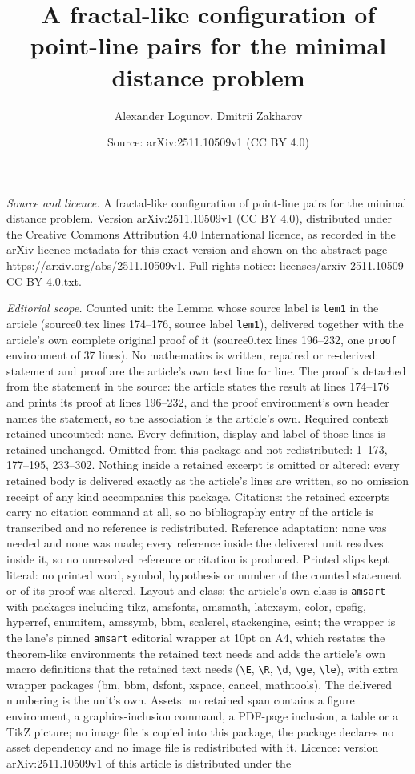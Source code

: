 \documentclass[10pt,a4paper]{amsart}
\title[A fractal-like configuration of point-line pairs for the min]{A fractal-like configuration of point-line pairs for the minimal distance problem}
\author{Alexander Logunov, Dmitrii Zakharov}
\date{Source: arXiv:2511.10509v1 (CC BY 4.0)}
\begin{document}
\maketitle

\noindent\emph{Source and licence.} A fractal-like configuration of point-line pairs for the minimal distance problem. Version arXiv:2511.10509v1 (CC BY 4.0), distributed under the Creative Commons Attribution 4.0 International licence, as recorded in the arXiv licence metadata for this exact version and shown on the abstract page https://arxiv.org/abs/2511.10509v1. Full rights notice: licenses/arxiv-2511.10509-CC-BY-4.0.txt.\par\smallskip

\noindent\textit{Editorial scope.} Counted unit: the Lemma whose source label is \texttt{lem1} in the article (source0.tex lines 174--176, source label \texttt{lem1}), delivered together with the article's own complete original proof of it (source0.tex lines 196--232, one \texttt{proof} environment of 37 lines). No mathematics is written, repaired or re-derived: statement and proof are the article's own text line for line. The proof is detached from the statement in the source: the article states the result at lines 174--176 and prints its proof at lines 196--232, and the proof environment's own header names the statement, so the association is the article's own. Required context retained uncounted: none. Every definition, display and label of those lines is retained unchanged. Omitted from this package and not redistributed: 1--173, 177--195, 233--302. Nothing inside a retained excerpt is omitted or altered: every retained body is delivered exactly as the article's lines are written, so no omission receipt of any kind accompanies this package. Citations: the retained excerpts carry no citation command at all, so no bibliography entry of the article is transcribed and no reference is redistributed. Reference adaptation: none was needed and none was made; every reference inside the delivered unit resolves inside it, so no unresolved reference or citation is produced. Printed slips kept literal: no printed word, symbol, hypothesis or number of the counted statement or of its proof was altered. Layout and class: the article's own class is \texttt{amsart} with packages including tikz, amsfonts, amsmath, latexsym, color, epsfig, hyperref, enumitem, amssymb, bbm, scalerel, stackengine, esint; the wrapper is the lane's pinned \texttt{amsart} editorial wrapper at 10pt on A4, which restates the theorem-like environments the retained text needs and adds the article's own macro definitions that the retained text needs (\texttt{\textbackslash E}, \texttt{\textbackslash R}, \texttt{\textbackslash d}, \texttt{\textbackslash ge}, \texttt{\textbackslash le}), with extra wrapper packages (bm, bbm, dsfont, xspace, cancel, mathtools). The delivered numbering is the unit's own. Assets: no retained span contains a figure environment, a graphics-inclusion command, a PDF-page inclusion, a table or a TikZ picture; no image file is copied into this package, the package declares no asset dependency and no image file is redistributed with it. Licence: version arXiv:2511.10509v1 of this article is distributed under the 
\end{document}
